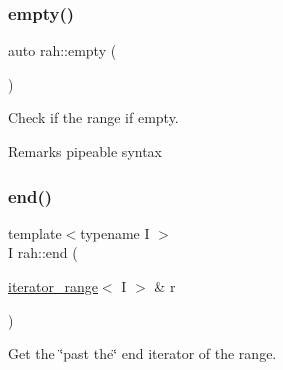 \subsubsection{\texorpdfstring{empty()}{empty()}\hspace{0.1cm}{\footnotesize\ttfamily [2/2]}}
{\footnotesize\ttfamily auto rah\+::empty (\begin{DoxyParamCaption}{ }\end{DoxyParamCaption})\hspace{0.3cm}{\ttfamily [inline]}}



Check if the range if empty. 

\begin{DoxyRemark}{Remarks}
pipeable syntax
\end{DoxyRemark}

\begin{DoxyCodeInclude}{0}
\end{DoxyCodeInclude}
\mbox{\label{namespacerah_aaddd1442cd76b96876e692cdefe7261d}} 
\subsubsection{\texorpdfstring{end()}{end()}\hspace{0.1cm}{\footnotesize\ttfamily [1/2]}}
{\footnotesize\ttfamily template$<$typename I $>$ \\
I rah\+::end (\begin{DoxyParamCaption}\item[{\mbox{\hyperlink{structrah_1_1iterator__range}{iterator\+\_\+range}}$<$ I $>$ \&}]{r }\end{DoxyParamCaption})}



Get the \char`\"{}past the\char`\"{} end iterator of the range. 

\mbox{\label{namespacerah_a6b31fe80bf81abf3149df010cb265e20}} 

